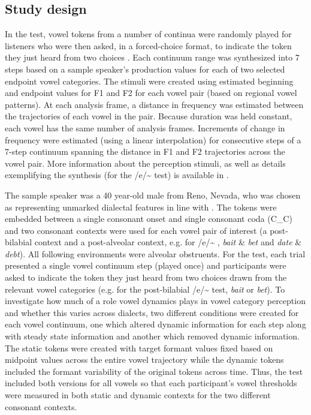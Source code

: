 \documentclass[output=paper]{LSP/langsci}
\begin{document}
\subsection{Study design}
In the test, vowel tokens from a number of continua were randomly played for listeners who were then asked, in a forced-choice format, to indicate the token they just heard from two choices \citep{strange_cross-language_1995,thomas_sociophonetic_2002}. Each continuum range was synthesized into 7 steps based on a sample speaker’s production values for each of two selected endpoint vowel categories. The stimuli were created using estimated beginning and endpoint values for F1 and F2 for each vowel pair (based on regional vowel patterns). At each analysis frame, a distance in frequency was estimated between the trajectories of each vowel in the pair. Because duration was held constant, each vowel has the same number of analysis frames. Increments of change in frequency were estimated (using a linear interpolation) for consecutive steps of a 7-step continuum spanning the distance in F1 and F2 trajectories across the vowel pair. More information about the perception stimuli, as well as details exemplifying the synthesis (for the /e/\~{}
test) is available in \citet{fridland_exploring_2012}.

The sample speaker was a 40 year-old male from Reno, Nevada, who was chosen as representing unmarked dialectal features in line with \citet{clopper_acoustic_2004}. The tokens were embedded between a single consonant onset and single consonant coda (C\_C) and two consonant contexts were used for each vowel pair of interest (a post-bilabial context and a post-alveolar context, e.g. for /e/\~{}
, \textit{bait} \& \textit{bet} and\textit{ date} \& \textit{debt}). All following environments were alveolar obstruents. For the test, each trial presented a single vowel continuum step (played once) and participants were asked to indicate the token they just heard from two choices drawn from the relevant vowel categories (e.g. for the post-bilabial /e/\~{}
test, \textit{bait} or \textit{bet}). To investigate how much of a role vowel dynamics plays in vowel category perception and whether this varies across dialects, two different conditions were created for each vowel continuum, one which altered dynamic information for each step along with steady state information and another which removed dynamic information. The static tokens were created with target formant values fixed based on midpoint values across the entire vowel trajectory while the dynamic tokens included the formant variability of the original tokens across time. Thus, the test included both versions for all vowels so that each participant’s vowel thresholds were measured in both static and dynamic contexts for the two different consonant contexts. 
\end{document}
